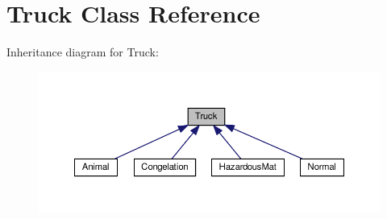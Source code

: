 \hypertarget{class_truck}{}\section{Truck Class Reference}
\label{class_truck}


Inheritance diagram for Truck\+:\nopagebreak
\begin{figure}[H]
\begin{center}
\leavevmode
\includegraphics[width=350pt]{class_truck__inherit__graph}
\end{center}
\end{figure}
